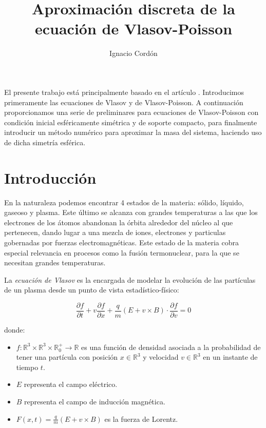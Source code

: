 \documentclass[a4paper,10pt]{scrartcl}
\title{Aproximación discreta de la ecuación de Vlasov-Poisson}
\author{
	Ignacio Cordón
}
\date{}
\theoremstyle{definition}
\numberwithin{equation}{section}
\begin{document}
\maketitle
\begin{center}
\end{center}
\tableofcontents
\pagebreak

El presente trabajo está principalmente basado en el artículo \cite{Schaeffer}. Introducimos primeramente las ecuaciones de Vlasov y de Vlasov-Poisson. A continuación proporcionamos una serie de preliminares para ecuaciones de Vlasov-Poisson con condición inicial esféricamente simétrica y de soporte compacto, para finalmente introducir un método numérico para aproximar la masa del sistema, haciendo uso de dicha simetría esférica.

\section{Introducción}
En la naturaleza podemos encontrar 4 estados de la materia: sólido, líquido, gaseoso y plasma. Este último se alcanza con grandes temperaturas a las que los electrones de los átomos abandonan la órbita alrededor del núcleo al que pertenecen, dando lugar a una mezcla de iones, electrones y particulas gobernadas por fuerzas electromagnéticas. Este estado de la materia cobra especial relevancia en procesos como la fusión termonuclear, para la que se necesitan grandes temperaturas.  

La \textit{ecuación de Vlasov} es la encargada de modelar la evolución de las partículas de un plasma desde un punto de vista estadístico-físico:

\begin{equation}
 \frac{\partial f}{\partial t} + v \frac{\partial f}{\partial x} + \frac{q}{m} (E + v\times B) \cdot \frac{\partial f}{\partial v} = 0
\end{equation}

donde:

\begin{itemize}
 \item $f:\mathbb{R}^3 \times \mathbb{R}^3 \times \mathbb{R}^{+}_0 \rightarrow \mathbb{R}$ es una función de densidad asociada a la probabilidad de tener una partícula con posición $x \in \mathbb{R}^3$ y velocidad $v \in \mathbb{R}^3$ en un instante de tiempo $t$. 
 \item $E$ representa el campo eléctrico.
 \item $B$ representa el campo de inducción magnética.
 \item $F(x,t) = \frac{q}{m}(E + v\times B)$ es la fuerza de Lorentz.
\end{itemize}
\end{document}
